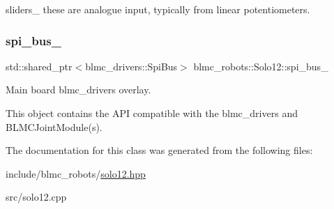 sliders\+\_\+ these are analogue input, typically from linear potentiometers. 

\mbox{\label{classblmc__robots_1_1Solo12_a416708664f404b0d140e02fe8b90bd00}} 
\subsubsection{\texorpdfstring{spi\+\_\+bus\+\_\+}{spi\_bus\_}}
{\footnotesize\ttfamily std\+::shared\+\_\+ptr$<$blmc\+\_\+drivers\+::\+Spi\+Bus$>$ blmc\+\_\+robots\+::\+Solo12\+::spi\+\_\+bus\+\_\+\hspace{0.3cm}{\ttfamily [private]}}



Main board blmc\+\_\+drivers overlay. 

This object contains the A\+PI compatible with the blmc\+\_\+drivers and B\+L\+M\+C\+Joint\+Module(s). 

The documentation for this class was generated from the following files\+:\begin{DoxyCompactItemize}
\item 
include/blmc\+\_\+robots/\hyperlink{solo12_8hpp}{solo12.\+hpp}\item 
src/solo12.\+cpp\end{DoxyCompactItemize}
